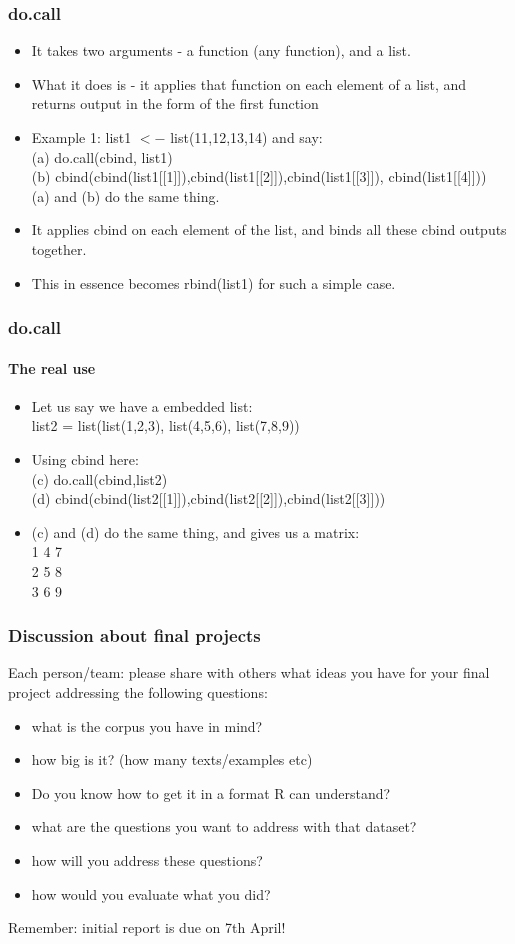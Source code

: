 \documentclass{beamer}
\begin{document}
\begin{frame}
\frametitle{do.call}
\begin{itemize}
\item It takes two arguments - a function (any function), and a list. 
\item What it does is - it applies that function on each element of a list, and returns output in the form of the first function
\item Example 1:
list1  $<-$ list(11,12,13,14) 
and say: \\ \tiny
(a) do.call(cbind, list1)
\\ (b) cbind(cbind(list1[[1]]),cbind(list1[[2]]),cbind(list1[[3]]), cbind(list1[[4]]))
\\ \normalsize (a) and (b) do the same thing.
\pause
\normalsize \item It applies cbind on each element of the list, and binds all these cbind outputs together. 
\item This in essence becomes rbind(list1) for such a simple case.
\end{itemize}
\end{frame}

\begin{frame}
\frametitle{do.call}
\framesubtitle{The real use}
\begin{itemize}
\item Let us say we have a embedded list:
\\ list2 = list(list(1,2,3), list(4,5,6), list(7,8,9))

\item Using cbind here:
\scriptsize 
\\ (c) do.call(cbind,list2)
\\ (d) cbind(cbind(list2[[1]]),cbind(list2[[2]]),cbind(list2[[3]]))
\normalsize \item (c) and (d) do the same thing, and gives us a matrix:
\\ 1 4 7
\\2 5 8
\\3 6 9 
\end{itemize}
\end{frame}

\begin{frame}
\frametitle{Discussion about final projects}
Each person/team: please share with others what ideas you have for your final project addressing the following questions:
\begin{itemize}
\item what is the corpus you have in mind?
\item how big is it? (how many texts/examples etc)
\item Do you know how to get it in a format R can understand?
\item what are the questions you want to address with that dataset?
\item how will you address these questions?
\item how would you evaluate what you did?
\end{itemize}
\pause Remember: initial report is due on 7th April!
\end{frame}
\end{document}
